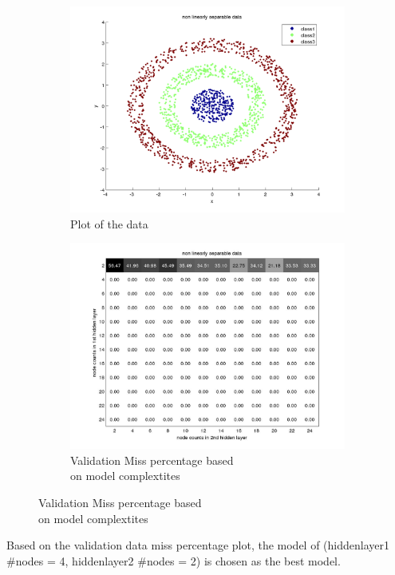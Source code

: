 \documentclass[fleqn]{article}
\begin{document}
\begin{figure}[!ht]
\begin{subfigure}{.5\textwidth}
  \caption{Plot of the data}
\includegraphics[scale=0.4]{pics/nonlinearlyseparable/dataPlot}
\end{subfigure}
\begin{subfigure}{.5\textwidth}
  \caption{Validation Miss percentage based\\ on model complextites}
\includegraphics[scale=0.2]{pics/nonlinearlyseparable/non linearly separable data_validationerror}
\end{subfigure}
\end{figure}

Based on the  validation data miss percentage plot, the model of (hiddenlayer1 \#nodes = 4, hiddenlayer2 \#nodes = 2) is chosen as the best model.
\end{document}
